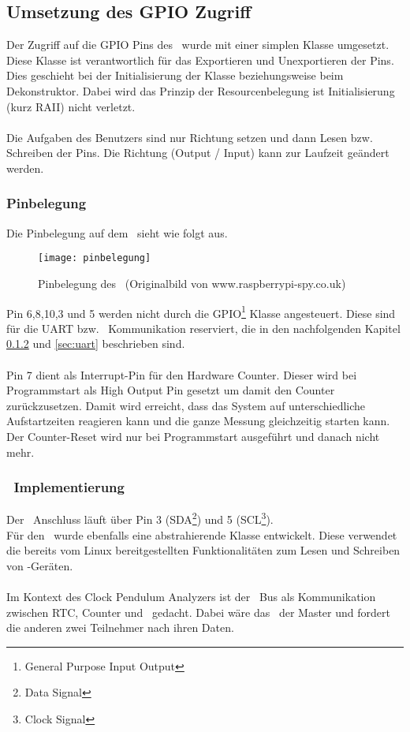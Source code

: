 \subsection{Umsetzung des GPIO Zugriff}
Der Zugriff auf die GPIO Pins des \rpi\ wurde mit einer simplen Klasse umgesetzt. Diese Klasse ist verantwortlich für das Exportieren und Unexportieren der Pins. Dies geschieht bei der Initialisierung der Klasse beziehungsweise beim Dekonstruktor. Dabei wird das Prinzip der Resourcenbelegung ist Initialisierung (kurz RAII) nicht verletzt.\\
\\
Die Aufgaben des Benutzers sind nur Richtung setzen und dann Lesen bzw. Schreiben der Pins. Die Richtung (Output / Input) kann zur Laufzeit geändert werden.

\subsubsection{Pinbelegung}
Die Pinbelegung auf dem \rpi\ sieht wie folgt aus.
\begin{figure}[H]
    \centering
    \texttt{[image: pinbelegung]}
    \caption{Pinbelegung des \rpi\ (Originalbild von www.raspberrypi-spy.co.uk)}
\end{figure}

\noindent Pin 6,8,10,3 und 5 werden nicht durch die GPIO\footnote{General Purpose Input Output} Klasse angesteuert. Diese sind für die UART bzw. \iic\ Kommunikation reserviert, die in den nachfolgenden Kapitel \ref{sec:i2c} und \ref{sec:uart} beschrieben sind.\\\\
Pin 7 dient als Interrupt-Pin für den Hardware Counter. Dieser wird bei Programmstart als High Output Pin gesetzt um damit den Counter zurückzusetzen. Damit wird erreicht, dass das System auf unterschiedliche Aufstartzeiten reagieren kann und die ganze Messung gleichzeitig starten kann. Der Counter-Reset wird nur bei Programmstart ausgeführt und danach nicht mehr.

\subsubsection{\iic\ Implementierung}\label{sec:i2c}
Der \iic\ Anschluss läuft über Pin 3 (SDA\footnote{Data Signal}) und 5 (SCL\footnote{Clock Signal}).\\
Für den \iic\ wurde ebenfalls eine abstrahierende Klasse entwickelt. Diese verwendet die bereits vom Linux bereitgestellten Funktionalitäten zum Lesen und Schreiben von \iic-Geräten.\\
\\
Im Kontext des Clock Pendulum Analyzers ist der \iic\ Bus als Kommunikation zwischen RTC, Counter und \rpi\ gedacht. 
Dabei wäre das \rpi\ der Master und fordert die anderen zwei Teilnehmer nach ihren Daten.

